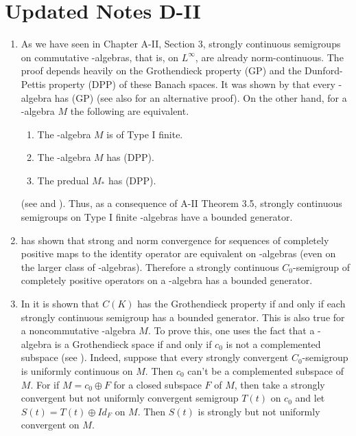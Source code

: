 \section{Updated Notes D-II}
\begin{enumerate}
\item 
As we have seen in Chapter A-II, Section 3, strongly continuous semigroups on commutative \WA-algebras, that is, on $L^{\infty}$, are already norm-continuous. 
The proof depends heavily on the Grothendieck property (GP) and the Dunford-Pettis property (DPP) of these Banach spaces. 
It was shown by  that every \WA-algebra has (GP) (see also  for an alternative proof).
On the other hand, for a \WA-algebra $M$ the following are equivalent.
\begin{enumerate}[\upshape(a)]
    \item The \WA-algebra $M$ is of Type I finite.
    \item The \WA-algebra $M$ has (DPP).
    \item The predual $M_{*}$ has (DPP).
\end{enumerate}
(see  and ).
Thus, as a consequence of A-II Theorem 3.5, strongly continuous semigroups on Type I finite \WA-algebras have a bounded generator. 

\item
{} has shown that strong and norm convergence for sequences of completely positive maps to the identity operator are equivalent on \WA-algebras (even on the larger class of \AW-algebras).
Therefore a strongly continuous $C_{0}$-semigroup of completely positive operators on a \WA-algebra has a bounded generator.

\item 
In  it is shown that $C(K)$ has the Grothendieck property if and only if each strongly continuous semigroup has a bounded generator. 
This is also true for a noncommutative \CA-algebra $M$.
To prove this, one uses the fact that a \CA-algebra is a Grothendieck space if and only if $c_{0}$ is not a complemented subspace (see ).
Indeed, suppose that every strongly convergent $C_{0}$-semigroup is uniformly continuous on $M$.
Then $c_{0}$ can't be a complemented subspace of $M$.
For if $M = c_{0} \oplus F$ for a closed subspace $F$ of $M$, then take a strongly convergent but not uniformly convergent semigroup ${T(t)}$ on $c_{0}$ and let $S(t) = T(t) \oplus Id_{F}$ on $M$. 
Then ${S(t)}$ is strongly but not uniformly convergent on $M$. 
%
\end{enumerate}